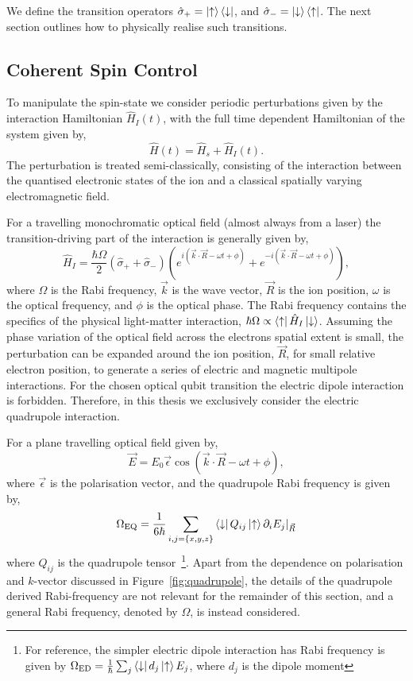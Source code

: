 We define the transition operators $\hat\sigma_+ = \ket{\uparrow}\bra{\downarrow}$, and $\hat\sigma_- = \ket{\downarrow}\bra{\uparrow}$.
The next section outlines how to physically realise such transitions.


\subsection{Coherent Spin Control}
\label{sec:qubit_control}

To manipulate the spin-state we consider periodic perturbations given by the interaction Hamiltonian $\hat H_I(t)$, with the full time dependent Hamiltonian of the system given by,
\begin{equation}
    \hat H(t) = \hat H_s + \hat H_I(t).
\end{equation}
The perturbation is treated semi-classically, consisting of the interaction between the
quantised electronic states of the ion and a classical spatially varying electromagnetic field.

For a travelling monochromatic optical field (almost always from a laser) the transition-driving part of the interaction is generally given by,
\begin{equation}
    \hat H_I = \frac{\hbar\Omega}{2}(\hat\sigma_+ + \hat\sigma_-)\left(e^{i(\vec k\cdot \vec R - \omega t + \phi)} + e^{-i(\vec k\cdot \vec R - \omega t +\phi)}\right),
\end{equation}
where $\Omega$ is the Rabi frequency, $\vec k$ is the wave vector, $\vec R$ is the ion position, $\omega$ is the optical frequency, and $\phi$ is the optical phase.
The Rabi frequency contains the specifics of the physical light-matter interaction, $\hbar\Omega\propto\bra{\uparrow}\hat H_I\ket{\downarrow}$.
Assuming the phase variation of the optical field across the electrons spatial extent is small, the perturbation can be expanded around the ion position, $\vec R$, for small relative electron position, to generate a series
of electric and magnetic multipole interactions. For the chosen optical qubit transition the electric dipole interaction is forbidden. Therefore, in this thesis we exclusively consider the electric quadrupole interaction.

For a plane travelling optical field given by,
\begin{equation}
    \vec E = E_0 \vec\epsilon \cos(\vec k\cdot \vec R - \omega t + \phi),
\end{equation}
where $\vec\epsilon$ is the polarisation vector, and the quadrupole Rabi frequency is given by,
\begin{equation}
    \Omega_{\rm EQ} = \frac{1}{6\hbar}\sum_{i,j=\{x,y,z\}}\bra{\downarrow}Q_{ij}\ket{\uparrow}\partial_i E_j\rvert_{\vec R}
\end{equation}
where $Q_{ij}$ is the quadrupole tensor~\cite{james_quantum_1998}\footnote{For reference, the simpler electric dipole interaction has Rabi frequency is given by
$\Omega_{\rm ED} = \frac{1}{\hbar}\sum_j\bra{\downarrow}d_j\ket{\uparrow}E_j$, where $d_j$ is the dipole moment}. Apart from the dependence on polarisation and $k$-vector discussed in Figure~\ref{fig:quadrupole}, the details of the quadrupole derived Rabi-frequency are not relevant for the remainder of this section, and a general Rabi frequency, denoted by $\Omega$, is instead considered.


